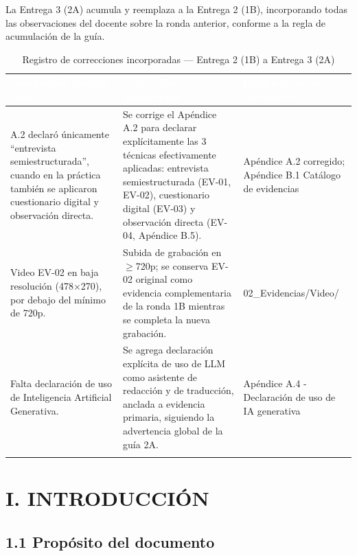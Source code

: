 
La Entrega 3 (2A) acumula y reemplaza a la Entrega 2 (1B), incorporando todas las observaciones del docente sobre la ronda anterior, conforme a la regla de acumulación de la guía.


\begingroup
\small
\begin{longtable}{|p{5.2cm}|p{5.2cm}|p{5.2cm}|}
\hline
\cellcolor{sigagreen}\textcolor{white}{\textbf{Observación docente (1B)}} & \cellcolor{sigagreen}\textcolor{white}{\textbf{Corrección incorporada}} & \cellcolor{sigagreen}\textcolor{white}{\textbf{Evidencia en este documento}} \\ \hline
A.2 declaró únicamente ``entrevista semiestructurada'', cuando en la práctica también se aplicaron cuestionario digital y observación directa. & Se corrige el Apéndice A.2 para declarar explícitamente las 3 técnicas efectivamente aplicadas: entrevista semiestructurada (EV-01, EV-02), cuestionario digital (EV-03) y observación directa (EV-04, Apéndice B.5). & Apéndice A.2 corregido; Apéndice B.1 Catálogo de evidencias \\ \hline
Video EV-02 en baja resolución (478$\times$270), por debajo del mínimo de 720p. & Subida de grabación en $\geq$720p; se conserva EV-02 original como evidencia complementaria de la ronda 1B mientras se completa la nueva grabación. & 02\_Evidencias/Video/ \\ \hline
Falta declaración de uso de Inteligencia Artificial Generativa. & Se agrega declaración explícita de uso de LLM como asistente de redacción y de traducción, anclada a evidencia primaria, siguiendo la advertencia global de la guía 2A. & Apéndice A.4 - Declaración de uso de IA generativa \\ \hline
\caption{Registro de correcciones incorporadas --- Entrega 2 (1B) a Entrega 3 (2A)}
\end{longtable}
\endgroup

\section*{I. INTRODUCCIÓN}


\subsection*{1.1 Propósito del documento}

